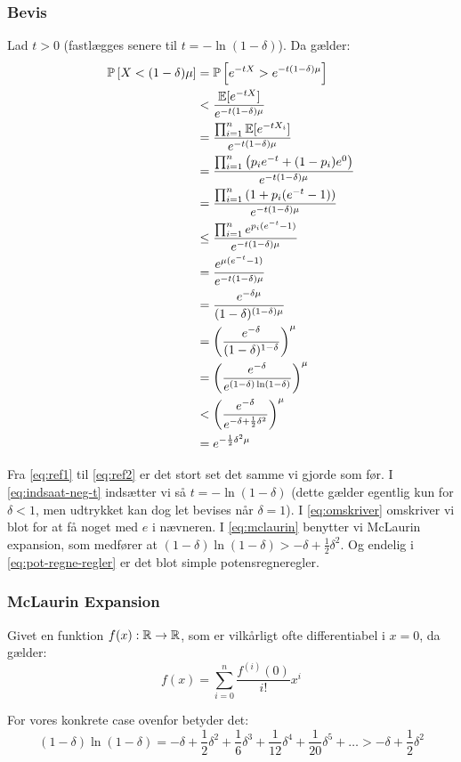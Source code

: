 \subsubsection{Bevis}
Lad $t > 0$ (fastlægges senere til $t = - \ln(1 - \delta)$). Da gælder:
\begin{align}
  \mathbb{P} \left[  X < (1 - \delta) \mu  \right]
  &= \mathbb{P} \left[  e^{- t X} > e^{-t (1 - \delta) \mu}   \right] \label{eq:ref1} \\
  &< \frac{{\mathbb E}[e^{-t X}]}{e^{-t (1 - \delta) \mu}} \nonumber \\
  &= \frac{\prod_{i=1}^n {\mathbb E}[e^{-t X_i}]}{e^{-t (1 - \delta) \mu}} \nonumber \\
  &= \frac{\prod_{i=1}^n \left( p_i e^{-t} + (1 - p_i) e^0 \right)}{e^{-t (1 - \delta) \mu}} \nonumber \\
  &= \frac{\prod_{i=1}^n \left( 1 + p_i (e^{-t} -1) \right)}{e^{-t (1 - \delta) \mu}} \nonumber \\
  &\leq \frac{\prod_{i=1}^n e^{p_i (e^{-t} - 1)}  }{e^{-t (1 - \delta) \mu}} \nonumber \\
  &= \frac{e^{\mu(e^{-t} - 1)}  }{e^{-t (1 - \delta) \mu}} \label{eq:ref2} \\
  &= \frac{e^{- \delta \mu}  }{ (1 - \delta)^{(1 - \delta) \mu} } \label{eq:indsaat-neg-t} \\
  &= \left( \frac{e^{-\delta}}{(1 - \delta)^{1 - \delta}} \right)^\mu \nonumber \\
  &= \left( \frac{e^{-\delta}}{e^{(1 - \delta) \ln (1 - \delta)}} \right)^\mu \label{eq:omskriver} \\
  &< \left( \frac{e^{- \delta}}{e^{- \delta + \frac{1}{2} \delta^2}} \right)^\mu \label{eq:mclaurin} \\
  &= e^{- \frac{1}{2} \delta^2 \mu} \label{eq:pot-regne-regler}
\end{align}

Fra \cref{eq:ref1} til \cref{eq:ref2} er det stort set det samme vi gjorde som før. I \cref{eq:indsaat-neg-t} indsætter vi så $t = - \ln(1 - \delta)$ (dette gælder egentlig kun for $\delta < 1$, men udtrykket kan dog let bevises når $\delta = 1$). I \cref{eq:omskriver} omskriver vi blot for at få noget med $e$ i nævneren. I \cref{eq:mclaurin} benytter vi McLaurin expansion, som medfører at $(1 - \delta) \ln(1 - \delta) > - \delta + \frac{1}{2} \delta^2$. Og endelig i \cref{eq:pot-regne-regler} er det blot simple potensregneregler.

\subsubsection{McLaurin Expansion}
Givet en funktion $f(x) : {\mathbb R} \to {\mathbb R}$, som er vilkårligt ofte differentiabel i $x = 0$, da gælder:
$$
f(x) = \sum_{i=0}^n \frac{f^{(i)} (0)}{i!} x^i
$$

For vores konkrete case ovenfor betyder det:
$$
(1 - \delta) \ln(1 - \delta)
= - \delta + \frac{1}{2} \delta^2 + \frac{1}{6} \delta^3 + \frac{1}{12} \delta^4 + \frac{1}{20} \delta^5 + \dots > - \delta + \frac{1}{2} \delta^2
$$

